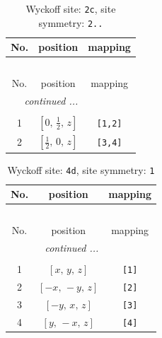 \documentclass[fleqn,8pt]{jsarticle}
\begin{document}
\begin{longtable}{ccc}
\caption{Wyckoff site: {\tt 2c}, site symmetry: {\tt 2..}}
 \\
 \hline \hline
No. & position & mapping \\ \hline \endfirsthead

\multicolumn{2}{l}{\tablename\ \thetable{}} \\
 \hline \hline
No. & position & mapping \\ \hline \endhead

 \hline \hline
\multicolumn{2}{r}{\footnotesize\it continued ...} \\ \endfoot

 \hline \hline
\multicolumn{2}{r}{} \\ \endlastfoot

1 & $\left[ 0,\, \frac{1}{2},\, z \right]$ & {\tt [1,2]} \\ \hline
2 & $\left[ \frac{1}{2},\, 0,\, z \right]$ & {\tt [3,4]} \\
\end{longtable}
\renewcommand{\arraystretch}{1.2}
\begin{longtable}{ccc}
\caption{Wyckoff site: {\tt 4d}, site symmetry: {\tt 1}}
 \\
 \hline \hline
No. & position & mapping \\ \hline \endfirsthead

\multicolumn{2}{l}{\tablename\ \thetable{}} \\
 \hline \hline
No. & position & mapping \\ \hline \endhead

 \hline \hline
\multicolumn{2}{r}{\footnotesize\it continued ...} \\ \endfoot

 \hline \hline
\multicolumn{2}{r}{} \\ \endlastfoot

1 & $\left[ x,\, y,\, z \right]$ & {\tt [1]} \\ \hline
2 & $\left[ - x,\, - y,\, z \right]$ & {\tt [2]} \\ \hline
3 & $\left[ - y,\, x,\, z \right]$ & {\tt [3]} \\ \hline
4 & $\left[ y,\, - x,\, z \right]$ & {\tt [4]} \\
\end{longtable}
\end{document}
